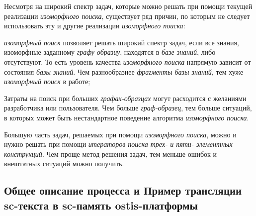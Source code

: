 Несмотря на широкий спектр задач, которые можно решать при помощи текущей реализации \textit{изоморфного поиска}, существует ряд причин, по которым не следует использовать эту и другие реализации \textit{изоморфного поиска}:
\begin{textitemize}
	\item \textit{изоморфный поиск} позволяет решать широкий спектр задач, если все знания, изоморфные заданному \textit{графу-образцу}, находятся в \textit{базе знаний}, либо отсутствуют. То есть уровень качества \textit{изоморфного поиска} напрямую зависит от состояния \textit{базы знаний}. Чем разнообразнее \textit{фрагменты базы знаний}, тем хуже \textit{изоморфный поиск} в работе;
	\item Затраты на поиск при больших \textit{графах-образцах} могут расходится с желаниями разработчика или пользователя. Чем больше \textit{граф-образец}, тем больше ситуаций, в которых может быть нестандартное поведение алгоритма \textit{изоморфного поиска}.
	\item Большую часть задач, решаемых при помощи \textit{изоморфного поиска}, можно и нужно решать при помощи \textit{итераторов поиска трех- и пяти- элементных конструкций}. Чем проще метод решения задач, тем меньше ошибок и внештатных ситуаций можно получить.
\end{textitemize}	

\subsection{Общее описание процесса и Пример трансляции sc-текста в sc-память ostis-платформы}
\label{sec_soft_platform_scin_code_example}

